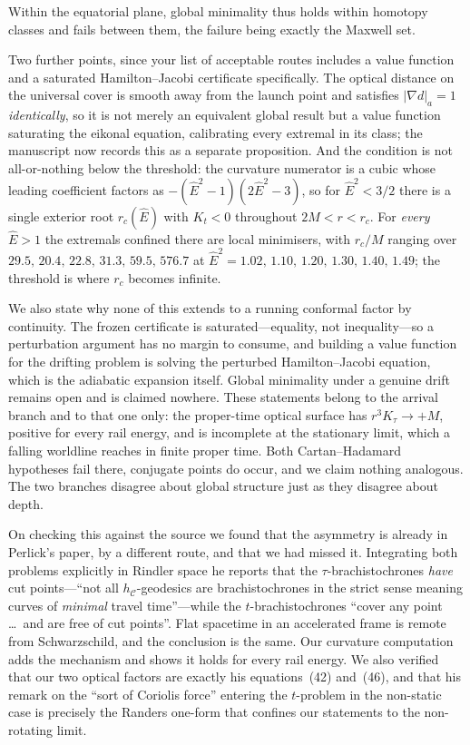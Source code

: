 \documentclass[11pt]{article}
\begin{document}
Within the equatorial plane, global minimality thus holds within homotopy classes
and fails between them, the failure being exactly the Maxwell set.

Two further points, since your list of acceptable routes includes a value
function and a saturated Hamilton--Jacobi certificate specifically. The optical
distance on the universal cover is smooth away from the launch point and
satisfies $|\nabla d|_a=1$ \emph{identically}, so it is not merely an equivalent
global result but a value function saturating the eikonal equation, calibrating
every extremal in its class; the manuscript now records this as a separate
proposition. And the condition is not all-or-nothing below the threshold: the
curvature numerator is a cubic whose leading coefficient factors as
$-(\hat E^2-1)(2\hat E^2-3)$, so for $\hat E^2<3/2$ there is a single exterior
root $r_c(\hat E)$ with $K_t<0$ throughout $2M<r<r_c$. For \emph{every}
$\hat E>1$ the extremals confined there are local minimisers, with $r_c/M$
ranging over $29.5,\,20.4,\,22.8,\,31.3,\,59.5,\,576.7$ at
$\hat E^2=1.02,\,1.10,\,1.20,\,1.30,\,1.40,\,1.49$; the threshold is where $r_c$
becomes infinite.

We also state why none of this extends to a running conformal factor by
continuity. The frozen certificate is saturated---equality, not
inequality---so a perturbation argument has no margin to consume, and building a
value function for the drifting problem is solving the perturbed
Hamilton--Jacobi equation, which is the adiabatic expansion itself. Global
minimality under a genuine drift remains open and is claimed nowhere. These statements belong to the arrival branch and to that one only: the
proper-time optical surface has $r^3K_\tau\to+M$, positive for every rail energy,
and is incomplete at the stationary limit, which a falling worldline reaches in
finite proper time. Both Cartan--Hadamard hypotheses fail there, conjugate points
do occur, and we claim nothing analogous. The two branches disagree about global
structure just as they disagree about depth.

On checking this against the source we found that the asymmetry is already in
Perlick's paper, by a different route, and that we had missed it. Integrating
both problems explicitly in Rindler space he reports that the
$\tau$-brachistochrones \emph{have} cut points---``not all $h_{\mathcal C}$-geodesics
are brachistochrones in the strict sense meaning curves of \emph{minimal} travel
time''---while the $t$-brachistochrones ``cover any point \dots\ and are free of
cut points''. Flat spacetime in an accelerated frame is remote from
Schwarzschild, and the conclusion is the same. Our curvature computation adds the
mechanism and shows it holds for every rail energy. We also verified that our two
optical factors are exactly his equations~(42) and~(46), and that his remark on
the ``sort of Coriolis force'' entering the $t$-problem in the non-static case is
precisely the Randers one-form that confines our statements to the non-rotating
limit.
\end{document}
